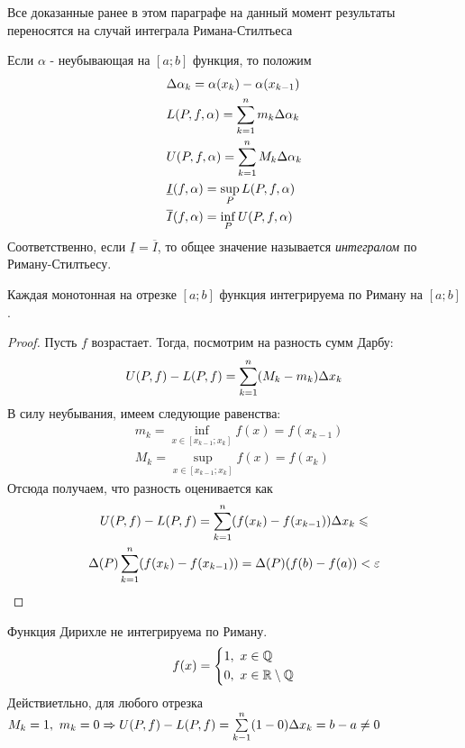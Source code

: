 \begin{note}
	Все доказанные ранее в этом параграфе на данный момент результаты переносятся на случай интеграла Римана-Стилтьеса
\end{note}

\begin{definition}
	Если $\alpha$ - неубывающая на $[a; b]$ функция, то положим
	\begin{align*}
		&{\Delta \alpha_k = \alpha(x_k) - \alpha(x_{k - 1})}
		\\
		&{L(P, f, \alpha) = \sum\limits_{k = 1}^n m_k \Delta \alpha_k}
		\\
		&{U(P, f, \alpha) = \sum\limits_{k = 1}^n M_k \Delta \alpha_k}
		\\
		&{\underline{I}(f, \alpha) = \sup\limits_P L(P, f, \alpha)}
		\\
		&{\overline{I}(f, \alpha) = \inf\limits_P U(P, f, \alpha)}
	\end{align*}
	Соответственно, если $\underline{I} = \overline{I}$, то общее значение называется \textit{интегралом} по Риману-Стилтьесу.
\end{definition}

\begin{theorem}
	Каждая монотонная на отрезке $[a; b]$ функция интегрируема по Риману на $[a; b]$.
\end{theorem}

\begin{proof}
	Пусть $f$ возрастает. Тогда, посмотрим на разность сумм Дарбу:
	\[
		U(P, f) - L(P, f) = \sum\limits_{k = 1}^n (M_k - m_k) \Delta x_k
	\]
	В силу неубывания, имеем следующие равенства:
	\begin{align*}
		&{m_k = \inf\limits_{x \in [x_{k - 1}; x_k]} f(x) = f(x_{k - 1})}
		\\
		&{M_k = \sup\limits_{x \in [x_{k - 1}; x_k]} f(x) = f(x_k)}
	\end{align*}
	Отсюда получаем, что разность оценивается как
	\begin{multline*}
		U(P, f) - L(P, f) = \sum\limits_{k = 1}^n (f(x_k) - f(x_{k - 1})) \Delta x_k \leqslant
		\\
		\Delta(P) \sum\limits_{k = 1}^n (f(x_k) - f(x_{k - 1})) = \Delta(P)(f(b) - f(a)) < \varepsilon
	\end{multline*}
\end{proof}

\begin{example}
	Функция Дирихле не интегрируема по Риману.
	\[
		f(x) = \left\{\begin{aligned}
			&1,\ x\in \mathbb{Q}
			\\
			&0,\ x\in \mathbb{R} \setminus \mathbb{Q}
		\end{aligned}\right.
	\]
	Действиетльно, для любого отрезка $M_k = 1,\ m_k = 0 \Rightarrow U(P, f) - L(P, f) = \sum\limits_{k - 1}^n(1 - 0)\Delta x_k = b - a \neq 0$
\end{example}

